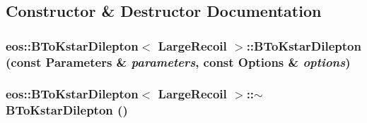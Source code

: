\subsection{Constructor \& Destructor Documentation}
\hypertarget{classeos_1_1BToKstarDilepton_3_01LargeRecoil_01_4_ab9804a9f493c78698f013d0775e14509}{
\subsubsection[{BToKstarDilepton}]{\setlength{\rightskip}{0pt plus 5cm}eos::BToKstarDilepton$<$ {\bf LargeRecoil} $>$::BToKstarDilepton (const {\bf Parameters} \& {\em parameters}, \/  const {\bf Options} \& {\em options})}}
\label{classeos_1_1BToKstarDilepton_3_01LargeRecoil_01_4_ab9804a9f493c78698f013d0775e14509}
\hypertarget{classeos_1_1BToKstarDilepton_3_01LargeRecoil_01_4_aaa5e93714aa6fe6fa4962da519f0d2b6}{
\subsubsection[{$\sim$BToKstarDilepton}]{\setlength{\rightskip}{0pt plus 5cm}eos::BToKstarDilepton$<$ {\bf LargeRecoil} $>$::$\sim$BToKstarDilepton ()}}
\label{classeos_1_1BToKstarDilepton_3_01LargeRecoil_01_4_aaa5e93714aa6fe6fa4962da519f0d2b6}


